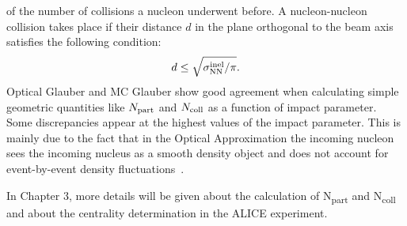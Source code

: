 of the number of collisions a nucleon underwent before. A nucleon-nucleon collision takes place if
their distance $d$ in the plane orthogonal to the beam axis satisfies the following condition:
\begin{equation}
d \leq \sqrt{\sigma^{\rm inel}_{\rm NN}/\pi}.
\end{equation}
Optical Glauber and MC Glauber show good agreement when calculating 
simple geometric quantities like $N_{\rm part}$ and $N_{\rm coll}$ as
a function of impact parameter. Some discrepancies appear at the highest values of the impact parameter.
This is mainly due to the fact that in the Optical Approximation the incoming nucleon sees the incoming nucleus as a smooth density object and does not account for event-by-event density fluctuations~\cite{Miller:2007ri}.



In Chapter 3, more details will be given about the calculation 
of N\textsubscript{part} and N\textsubscript{coll} and about the centrality 
determination in the ALICE experiment.


